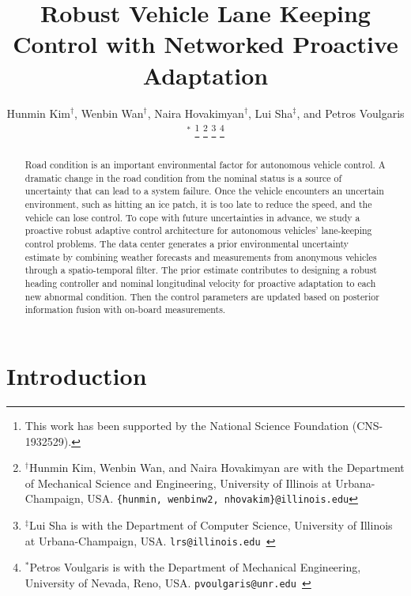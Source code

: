 \documentclass[letterpaper, 10 pt, conference]{ieeeconf}
\title{\LARGE \bf
Robust Vehicle Lane Keeping Control with Networked Proactive Adaptation}
\author{Hunmin Kim$^{\dagger}$, Wenbin Wan$^{\dagger}$, Naira Hovakimyan$^{\dagger}$, Lui Sha$^{\ddagger}$, and Petros Voulgaris$^{*}$
\thanks{This work has been supported by the National Science Foundation (CNS-1932529).}
\thanks{$^{\dagger}$Hunmin Kim, Wenbin Wan, and Naira Hovakimyan are with the Department of Mechanical Science and Engineering, University of Illinois at Urbana-Champaign, USA.
{\tt\small  \{hunmin, wenbinw2, nhovakim\}@illinois.edu}}%
\thanks{$^{\ddagger}$Lui Sha is with the Department of Computer Science, University of Illinois at Urbana-Champaign, USA.
{\tt\small  lrs@illinois.edu }}%
\thanks{$^{*}$Petros Voulgaris is with the Department of Mechanical Engineering, University of Nevada, Reno, USA.
{\tt\small  pvoulgaris@unr.edu }}
}
\begin{document}
\maketitle
\thispagestyle{empty}
\pagestyle{empty}


\begin{abstract}
Road condition is an important environmental factor for autonomous vehicle control.
A dramatic change in the road condition from the nominal status is a source of uncertainty that can lead to a system failure.
Once the vehicle encounters an uncertain environment, such as hitting an ice patch, it is too late to reduce the speed, and the vehicle can lose control.
To cope with future uncertainties in advance, we study a proactive robust adaptive control architecture for autonomous vehicles' lane-keeping control problems.
The data center generates a prior environmental uncertainty estimate by combining weather forecasts and measurements from anonymous vehicles through a spatio-temporal filter.
The prior estimate contributes to designing a robust heading controller and nominal longitudinal velocity for  proactive adaptation to each new abnormal condition.
Then the control parameters are updated based on posterior information fusion with on-board measurements.
\end{abstract}

\maketitle

\section{Introduction}
\end{document}
